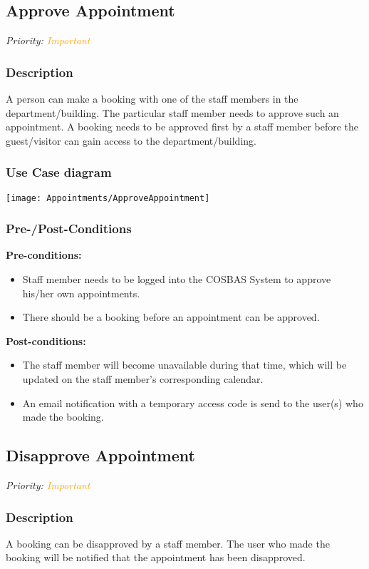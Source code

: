 \subsection{Approve Appointment}
\textit{Priority: \textcolor{orange}{Important}} 

\subsubsection{Description}
A person can make a booking with one of the staff members in the department/building. The particular staff member needs to approve such an appointment. A booking needs to be approved first by a staff member before the guest/visitor can gain access to the department/building.

\subsubsection{Use Case diagram}
\texttt{[image: Appointments/ApproveAppointment]}
\subsubsection{Pre-/Post-Conditions}
\textbf{Pre-conditions:} 
	\begin{itemize}
		\item Staff member needs to be logged into the COSBAS System to approve his/her own appointments.
		\item There should be a booking before an appointment can be approved.
	\end{itemize}
\textbf{ Post-conditions:} 
	\begin{itemize}
		\item The staff member will become unavailable during that time, which will be updated on the staff member's corresponding calendar.
		\item An email notification with a temporary access code is send to the user(s) who made the booking.
	\end{itemize}

\subsection{Disapprove Appointment}
\textit{Priority: \textcolor{orange}{Important}}

\subsubsection{Description}
A booking can be disapproved by a staff member. The user who made the booking will be notified that the appointment has been disapproved. 

